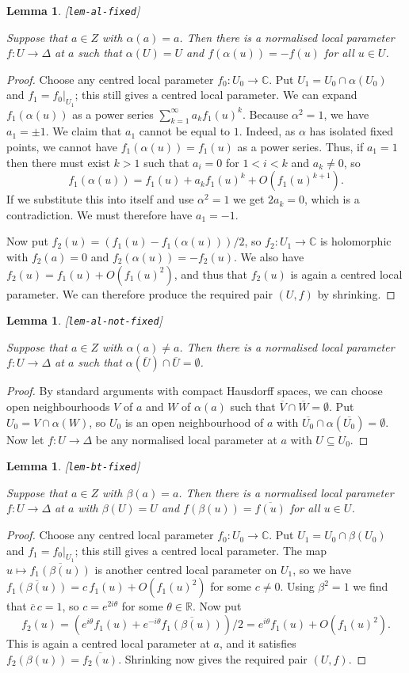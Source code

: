 \documentclass[reqno]{amsart}
\newcommand{\lbl}[1]{\label{#1}\textup{[\texttt{#1}]}\par}
\newcommand{\lbl}{\label}
\newcommand{\Dl}        {\Delta}
\newcommand{\al}        {\alpha}
\newcommand{\bt}        {\beta}
\newcommand{\tht}       {\theta}
\newcommand{\R}         {{\mathbb{R}}}
\newcommand{\C}         {{\mathbb{C}}}
\newcommand{\ov}[1]     {\overline{#1}}
\newcommand{\sse}       {\subseteq}
\renewcommand{\:}{\colon}
\newtheorem{lemma}[theorem]{Lemma}
\theoremstyle{definition}
\begin{document}
\begin{lemma}\lbl{lem-al-fixed}
 Suppose that $a\in Z$ with $\al(a)=a$.  Then there is a normalised
 local parameter $f\:U\to\Dl$ at $a$ such that $\al(U)=U$ and
 $f(\al(u))=-f(u)$ for all $u\in U$.
\end{lemma}
\begin{proof}
 Choose any centred local parameter $f_0\:U_0\to\C$.  Put
 $U_1=U_0\cap\al(U_0)$ and $f_1=f_0|_{U_1}$; this still gives a
 centred local parameter.  We can expand $f_1(\al(u))$ as a power
 series $\sum_{k=1}^\infty a_kf_1(u)^k$.  Because $\al^2=1$, we have
 $a_1=\pm 1$.  We claim that $a_1$ cannot be equal to $1$.  Indeed, as
 $\al$ has isolated fixed points, we cannot have $f_1(\al(u))=f_1(u)$
 as a power series.  Thus, if $a_1=1$ then there must exist $k>1$ such
 that $a_i=0$ for $1<i<k$ and $a_k\neq 0$, so
 \[ f_1(\al(u)) = f_1(u) + a_kf_1(u)^k + O(f_1(u)^{k+1}). \]
 If we substitute this into itself and use $\al^2=1$ we get $2a_k=0$,
 which is a contradiction.  We must therefore have $a_1=-1$.

 Now put $f_2(u)=(f_1(u)-f_1(\al(u)))/2$, so $f_2\:U_1\to\C$ is
 holomorphic with $f_2(a)=0$ and $f_2(\al(u))=-f_2(u)$.  We also have
 $f_2(u)=f_1(u)+O(f_1(u)^2)$, and thus that $f_2(u)$ is again a
 centred local parameter.  We can therefore produce the required pair
 $(U,f)$ by shrinking.
\end{proof}

\begin{lemma}\lbl{lem-al-not-fixed}
 Suppose that $a\in Z$ with $\al(a)\neq a$.  Then there is a
 normalised local parameter $f\:U\to \Dl$ at $a$ such that
 $\al(\ov{U})\cap\ov{U}=\emptyset$.
\end{lemma}
\begin{proof}
 By standard arguments with compact Hausdorff spaces, we can choose
 open neighbourhoods $V$ of $a$ and $W$ of $\al(a)$ such  that
 $\ov{V}\cap\ov{W}=\emptyset$.  Put $U_0=V\cap\al(W)$, so $U_0$ is an
 open neighbourhood of $a$ with
 $\ov{U_0}\cap\al(\ov{U_0})=\emptyset$.  Now let $f\:U\to \Dl$ be any
 normalised local parameter at $a$ with $U\sse U_0$.
\end{proof}

\begin{lemma}\lbl{lem-bt-fixed}
 Suppose that $a\in Z$ with $\bt(a)=a$.  Then there is a normalised
 local parameter $f\:U\to \Dl$ at $a$ with $\bt(U)=U$ and
 $f(\bt(u))=\ov{f(u)}$ for all $u\in U$.
\end{lemma}
\begin{proof}
 Choose any centred local parameter $f_0\:U_0\to\C$.  Put
 $U_1=U_0\cap\bt(U_0)$ and $f_1=f_0|_{U_1}$; this still gives a
 centred local parameter.  The map $u\mapsto\ov{f_1(\bt(u))}$ is
 another centred local parameter on $U_1$, so we have
 $\ov{f_1(\bt(u))}=c\,f_1(u)+O(f_1(u)^2)$ for some $c\neq 0$.  Using
 $\bt^2=1$ we find that $\ov{c}\,c=1$, so $c=e^{2i\tht}$ for some
 $\tht\in\R$.  Now put
 \[ f_2(u) = (e^{i\tht} f_1(u) + e^{-i\tht}\ov{f_1(\bt(u))})/2
       = e^{i\tht} f_1(u) + O(f_1(u)^2).
 \]
 This is again a centred local parameter at $a$, and it satisfies
 $f_2(\bt(u))=\ov{f_2(u)}$.  Shrinking now gives the required pair
 $(U,f)$.
\end{proof}
\end{document}
